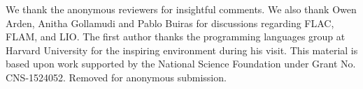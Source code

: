 \ifx\review\undefined
We thank the anonymous reviewers for insightful comments. We also thank Owen Arden, Anitha Gollamudi and Pablo Buiras for discussions regarding FLAC, FLAM, and LIO. The first author thanks the programming languages group at Harvard University for the inspiring environment during his visit. This material is based upon work supported by the National Science Foundation under Grant No. CNS-1524052.
\else
Removed for anonymous submission.
\fi